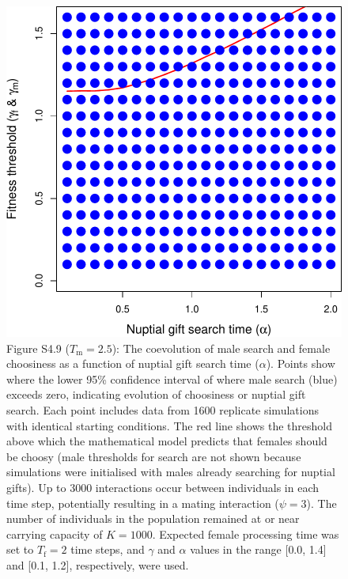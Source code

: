 \documentclass[
]{article}
\begin{document}
\captionsetup{labelformat=empty}

\begin{figure}
\centering
\includegraphics{ms_refs_fixed_files/figure-latex/unnamed-chunk-14-1.pdf}
\caption{Figure S4.9 (\(T_{\mathrm{m}} = 2.5\)): The coevolution of male
search and female choosiness as a function of nuptial gift search time
(\(\alpha\)). Points show where the lower 95\% confidence interval of
where male search (blue) exceeds zero, indicating evolution of
choosiness or nuptial gift search. Each point includes data from 1600
replicate simulations with identical starting conditions. The red line
shows the threshold above which the mathematical model predicts that
females should be choosy (male thresholds for search are not shown
because simulations were initialised with males already searching for
nuptial gifts). Up to 3000 interactions occur between individuals in
each time step, potentially resulting in a mating interaction
(\(\psi = 3\)). The number of individuals in the population remained at
or near carrying capacity of \(K = 1000\). Expected female processing
time was set to \(T_{\mathrm{f}}=2\) time steps, and \(\gamma\) and
\(\alpha\) values in the range {[}0.0, 1.4{]} and {[}0.1, 1.2{]},
respectively, were used.}
\end{figure}

\captionsetup{labelformat=default}
\end{document}
